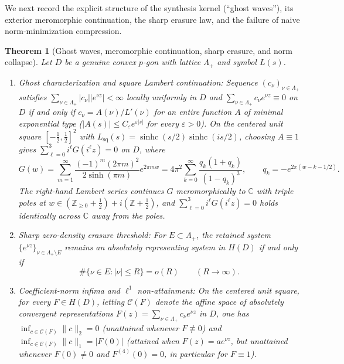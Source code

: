 \documentclass[11pt,reqno]{amsart}
\newtheorem{theorem}{Theorem}[section]
\theoremstyle{definition}
\theoremstyle{remark}
\newcommand{\C}{\mathbb{C}}
\newcommand{\Z}{\mathbb{Z}}
\DeclareMathOperator{\sinhc}{sinhc}
\begin{document}
We next record the explicit structure of the synthesis kernel (``ghost waves''), its exterior meromorphic continuation, the sharp erasure law, and the failure of naive norm-minimization compression.

\begin{theorem}[Ghost waves, meromorphic continuation, sharp erasure, and norm collapse]\label{thm:ghost-erasure}
Let $D$ be a genuine convex $p$-gon with lattice $\Lambda_+$ and symbol $L(s)$.
\begin{enumerate}
  \item \emph{Ghost characterization and square Lambert continuation}: Sequence $(c_\nu)_{\nu \in \Lambda_+}$ satisfies $\sum_{\nu \in \Lambda_+} |c_\nu| |e^{\nu z}| < \infty$ locally uniformly in $D$ and $\sum_{\nu \in \Lambda_+} c_\nu e^{\nu z} \equiv 0$ on $D$ if and only if $c_\nu = A(\nu)/L'(\nu)$ for an entire function $A$ of minimal exponential type ($|A(s)| \le C_\varepsilon e^{\varepsilon|s|}$ for every $\varepsilon > 0$). On the centered unit square $[-\frac12,\frac12]^2$ with $L_{\mathrm{sq}}(s) = \sinhc(s/2)\sinhc(is/2)$, choosing $A \equiv 1$ gives $\sum_{\ell=0}^3 i^\ell G(i^\ell z) = 0$ on $D$, where
  \begin{equation}\label{eq:square-ghost}
    G(w) = \sum_{m=1}^\infty \frac{(-1)^m (2\pi m)^2}{2\sinh(\pi m)} e^{2\pi m w}
    = 4\pi^2 \sum_{k=0}^\infty \frac{q_k(1 + q_k)}{(1 - q_k)^3}, \qquad q_k = -e^{2\pi(w - k - 1/2)}.
  \end{equation}
  The right-hand Lambert series continues $G$ meromorphically to $\C$ with triple poles at $w \in (\Z_{\ge 0} + \frac12) + i(\Z + \frac12)$, and $\sum_{\ell=0}^3 i^\ell G(i^\ell z) = 0$ holds identically across $\C$ away from the poles.
  \item \emph{Sharp zero-density erasure threshold}: For $E \subset \Lambda_+$, the retained system $\{e^{\nu z}\}_{\nu \in \Lambda_+ \setminus E}$ remains an absolutely representing system in $H(D)$ \emph{if and only if}
  \begin{equation}\label{eq:erasure}
    \#\{\nu \in E : |\nu| \le R\} = o(R) \qquad (R \to \infty).
  \end{equation}
  \item \emph{Coefficient-norm infima and $\ell^1$ non-attainment}: On the centered unit square, for every $F \in H(D)$, letting $\mathcal{C}(F)$ denote the affine space of absolutely convergent representations $F(z) = \sum_{\nu \in \Lambda_+} c_\nu e^{\nu z}$ in $D$, one has $\inf_{c \in \mathcal{C}(F)} \|c\|_2 = 0$ (unattained whenever $F \not\equiv 0$) and $\inf_{c \in \mathcal{C}(F)} \|c\|_1 = |F(0)|$ (attained when $F(z) = a e^{\nu z}$, but unattained whenever $F(0) \ne 0$ and $F^{(4)}(0) = 0$, in particular for $F \equiv 1$).
\end{enumerate}
\end{theorem}
\end{document}
